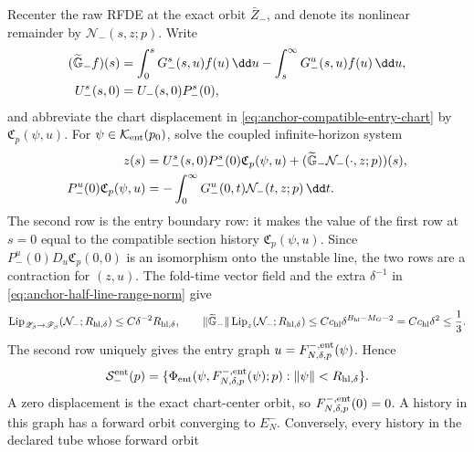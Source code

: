 \begin{lemma}
Recenter the raw RFDE at the exact orbit \(\bar Z_-\), and denote its
nonlinear remainder by \(\mathcal N_-(s,z;p)\).  Write
\begin{align}
 (\widetilde{\mathbb G}_-f)(s)
 &=\int_0^sG_-^s(s,u)f(u)\,\dd u
   -\int_s^\infty G_-^u(s,u)f(u)\,\dd u,\notag\\
 U_-^s(s,0)&=U_-(s,0)P_-^s(0),                       \label{eq:anchor-exact-mixed-Green}
\end{align}
and abbreviate the chart displacement in
\cref{eq:anchor-compatible-entry-chart} by
\(\mathfrak C_p(\psi,u)\).  For
\(\psi\in\mathcal K_{\rm ent}(p_0)\), solve the coupled infinite-horizon
system
\begin{align}
 z(s)
 &=U_-^s(s,0)P_-^s(0)\mathfrak C_p(\psi,u)
   +(\widetilde{\mathbb G}_-
          \mathcal N_-(\cdot,z;p))(s),\notag\\
 P_-^u(0)\mathfrak C_p(\psi,u)
 &=-\int_0^\infty G_-^u(0,t)
          \mathcal N_-(t,z;p)\,\dd t .               \label{eq:anchor-annulus-nonlinear-map}
\end{align}
The second row is the entry boundary row: it makes the value of the first
row at \(s=0\) equal to the compatible section history
\(\mathfrak C_p(\psi,u)\).  Since
\(P_-^u(0)D_u\mathfrak C_p(0,0)\) is an isomorphism onto the unstable
line, the two rows are a contraction for \((z,u)\).  The fold-time vector
field and the extra \(\delta^{-1}\) in
\cref{eq:anchor-half-line-range-norm} give
\begin{equation}
 \operatorname{Lip}_{\mathscr Z_\beta\to\mathscr F_\beta}
       (\mathcal N_-;R_{\mathrm{hl},\delta})
 \le C\delta^{-2}R_{\mathrm{hl},\delta},\qquad
 \|\widetilde{\mathbb G}_-\|
       \operatorname{Lip}_z(\mathcal N_-;R_{\mathrm{hl},\delta})
 \le Cc_{\rm hl}\delta^{B_{\rm hl}-M_G-2}
 =Cc_{\rm hl}\delta^2
 \le\frac13.                                         \label{eq:anchor-half-line-contraction-ledger}
\end{equation}
The second row uniquely gives the entry graph
\(u=F^{-,\rm ent}_{N,\delta,p}(\psi)\).  Hence
\begin{equation}
 \mathcal S_-^{\rm ent}(p)
 =\{\Phi_{\rm ent}(\psi,F^{-,\rm ent}_{N,\delta,p}(\psi);p):
                         \|\psi\|<R_{\mathrm{hl},\delta}\}. \label{eq:anchor-intrinsic-entry-sheet}
\end{equation}
A zero displacement is the exact chart-center orbit, so
\(F^{-,\rm ent}_{N,\delta,p}(0)=0\).
A history in this graph has a forward orbit converging to \(E_N^-\).
Conversely, every history in the declared tube whose forward orbit

\end{lemma}
